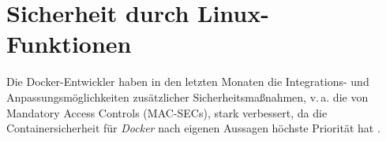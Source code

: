 \documentclass[../main.tex]{subfiles}
\begin{document}









\chapter{Sicherheit durch Linux-\\Funktionen}
\label{secLinux}
	Die Docker-Entwickler haben in den letzten Monaten die Integrations- und Anpassungsmöglichkeiten zusätzlicher Sicherheitsmaßnahmen, v.\,a. die von Mandatory Access Controls (\acrshort{MAC-SEC}s), stark verbessert, da die Containersicherheit für \emph{Docker} nach eigenen Aussagen höchste Priorität hat \cite{githubDockerRoadmap}\cite{githubDockerChangelog}.
\end{document}
